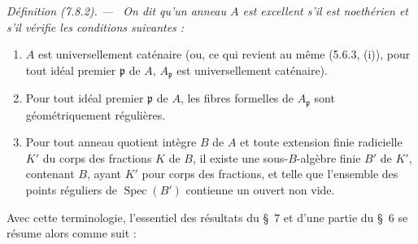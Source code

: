 \documentclass[10pt,oneside]{book}
\makeatletter
\newenvironment{definition}[1][]{%
  \par\medskip\noindent\itshape Définition (#1). ---\ }{\par}
\newcommand{\EGAReaderTarget}[2]{\hypertarget{#1}{}\@bsphack\begingroup\def\@currentHref{#1}\label{#2}\endgroup\@esphack}
\makeatother
\begin{document}
\begin{definition}[7.8.2]
\EGAReaderTarget{ega4.c04.def.7-8-2}{IV.2.s7.8.2-fr}
On dit qu'un anneau $A$ est excellent s'il est noethérien et s'il
vérifie les conditions suivantes :
\begin{enumerate}
\item[\emph{(i)}] $A$ est universellement caténaire (ou, ce qui revient au même
(5.6.3, (i)), pour tout idéal premier $\mathfrak p$ de $A$,
$A_{\mathfrak p}$ est universellement caténaire).
\item[\emph{(ii)}] Pour tout idéal premier $\mathfrak p$ de $A$, les fibres
formelles de $A_{\mathfrak p}$ sont géométriquement régulières.
\item[\emph{(iii)}] Pour tout anneau quotient intègre $B$ de $A$ et toute
extension finie radicielle $K'$ du corps des fractions $K$ de $B$, il existe
une sous-$B$-algèbre finie $B'$ de $K'$, contenant $B$, ayant $K'$ pour corps
des fractions, et telle que l'ensemble des points réguliers de
$\operatorname{Spec}(B')$ contienne un ouvert non vide.
\end{enumerate}
\upshape
Avec cette terminologie, l'essentiel des résultats du \S~7 et d'une partie du
\S~6 se résume alors comme suit :
\end{definition}
\end{document}
